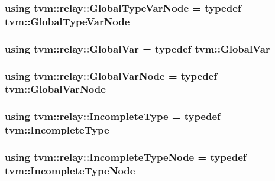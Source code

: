 \subsubsection[{\texorpdfstring{Global\+Type\+Var\+Node}{GlobalTypeVarNode}}]{\setlength{\rightskip}{0pt plus 5cm}using {\bf tvm\+::relay\+::\+Global\+Type\+Var\+Node} = typedef {\bf tvm\+::\+Global\+Type\+Var\+Node}}\hypertarget{namespacetvm_1_1relay_a9a10e2305e3a50dd00e07b043b93b5e8}{}\label{namespacetvm_1_1relay_a9a10e2305e3a50dd00e07b043b93b5e8}
\subsubsection[{\texorpdfstring{Global\+Var}{GlobalVar}}]{\setlength{\rightskip}{0pt plus 5cm}using {\bf tvm\+::relay\+::\+Global\+Var} = typedef {\bf tvm\+::\+Global\+Var}}\hypertarget{namespacetvm_1_1relay_a81ac7c3d0824529fddce7849c9c66289}{}\label{namespacetvm_1_1relay_a81ac7c3d0824529fddce7849c9c66289}
\subsubsection[{\texorpdfstring{Global\+Var\+Node}{GlobalVarNode}}]{\setlength{\rightskip}{0pt plus 5cm}using {\bf tvm\+::relay\+::\+Global\+Var\+Node} = typedef {\bf tvm\+::\+Global\+Var\+Node}}\hypertarget{namespacetvm_1_1relay_afe7144195dbbc914183189444ef6a347}{}\label{namespacetvm_1_1relay_afe7144195dbbc914183189444ef6a347}
\subsubsection[{\texorpdfstring{Incomplete\+Type}{IncompleteType}}]{\setlength{\rightskip}{0pt plus 5cm}using {\bf tvm\+::relay\+::\+Incomplete\+Type} = typedef {\bf tvm\+::\+Incomplete\+Type}}\hypertarget{namespacetvm_1_1relay_a34535a1f05224c26db569bc134de7647}{}\label{namespacetvm_1_1relay_a34535a1f05224c26db569bc134de7647}
\subsubsection[{\texorpdfstring{Incomplete\+Type\+Node}{IncompleteTypeNode}}]{\setlength{\rightskip}{0pt plus 5cm}using {\bf tvm\+::relay\+::\+Incomplete\+Type\+Node} = typedef {\bf tvm\+::\+Incomplete\+Type\+Node}}\hypertarget{namespacetvm_1_1relay_a517ebee34b82bdb80f74ffcdcf361940}{}\label{namespacetvm_1_1relay_a517ebee34b82bdb80f74ffcdcf361940}
